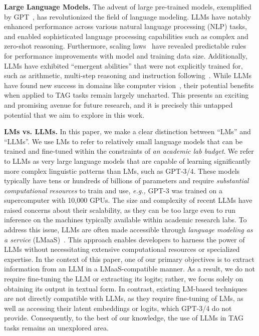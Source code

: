 \documentclass{article}
\newcommand{\eg}{\emph{e.g.,}\xspace}
\begin{document}
\textbf{Large Language Models.}
The advent of large pre-trained models, exemplified by GPT~\citep{brown2020language_gpt}, has revolutionized the field of language modeling. LLMs have notably enhanced performance across various natural language processing (NLP) tasks, and enabled sophisticated language processing capabilities such as complex and zero-shot reasoning. 
Furthermore, scaling laws~\citep{kaplan2020scaling_law} have revealed predictable rules for performance improvements with model and training data size. Additionally, LLMs have exhibited ``emergent abilities'' that were not explicitly trained for, such as arithmetic, multi-step reasoning and instruction following~\citep{wei2022emergent}. 
While LLMs have found new success in domains like computer vision~\citep{tsimpoukelli2021multimodal}, their potential benefits when applied to TAG tasks remain largely uncharted. This presents an exciting and promising avenue for future research, and it is precisely this untapped potential that we aim to explore in this work.

\textbf{LMs vs. LLMs.} In this paper, we make a clear distinction between ``LMs'' and ``LLMs''. We use LMs to refer to relatively small language models that can be trained and fine-tuned within the constraints of  {\it an academic lab budget}. We refer to LLMs as very large language models that are capable of learning significantly more complex linguistic patterns than LMs, such as GPT-3/4. These models typically have tens or hundreds of billions of parameters and require {\it substantial computational resources} to train and use, \eg GPT-3 was trained on a supercomputer with 10,000 GPUs. The size and complexity of recent LLMs have raised concerns about their scalability, as they can be too large even to run inference on the machines typically available within academic research labs. To address this issue, LLMs are often made accessible through {\it language modeling as a service} (LMaaS)~\citep{sun2022black_lmaas}. This approach enables developers to harness the power of LLMs without necessitating extensive computational resources or specialized expertise. In the context of this paper, one of our primary objectives is to extract information from an LLM in a LMaaS-compatible manner. As a result, we do not require fine-tuning the LLM or extracting its logits; rather, we focus solely on obtaining its output in textual form. In contrast, existing LM-based techniques~\citep{chien2021node_giant, zhao2022learning_em, dinh2022e2eg} are not directly compatible with LLMs, as they require fine-tuning of LMs, as well as accessing their latent embeddings or logits, which GPT-3/4 do not provide. Consequently, to the best of our knowledge, the use of LLMs in TAG tasks remains an unexplored area.
\end{document}
